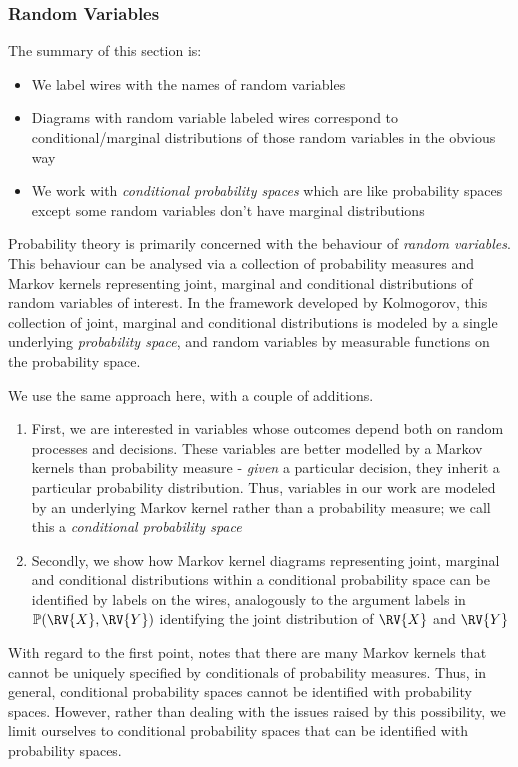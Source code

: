 \subsubsection{Random Variables}\label{par:random_variables}

The summary of this section is:
\begin{itemize}
\item We label wires with the names of random variables
\item Diagrams with random variable labeled wires correspond to conditional/marginal distributions of those random variables in the obvious way
\item We work with \emph{conditional probability spaces} which are like probability spaces except some random variables don't have marginal distributions
\end{itemize}

Probability theory is primarily concerned with the behaviour of \emph{random variables}. This behaviour can be analysed via a collection of probability measures and Markov kernels representing joint, marginal and conditional distributions of random variables of interest. In the framework developed by Kolmogorov, this collection of joint, marginal and conditional distributions is modeled by a single underlying \emph{probability space}, and random variables by measurable functions on the probability space. 

We use the same approach here, with a couple of additions. 

\begin{enumerate}
	\item First, we are interested in variables whose outcomes depend both on random processes and decisions. These variables are better modelled by a Markov kernels than probability measure - \emph{given} a particular decision, they inherit a particular probability distribution. Thus, variables in our work are modeled by an underlying Markov kernel rather than a probability measure; we call this a \emph{conditional probability space}
	\item Secondly, we show how Markov kernel diagrams representing joint, marginal and conditional distributions within a conditional probability space can be identified by labels on the wires, analogously to the argument labels in $\mathbb{P}(\RV{X},\RV{Y})$ identifying the joint distribution of $\RV{X}$ and $\RV{Y}$ 
\end{enumerate}

With regard to the first point, \citet{hajek_what_2003} notes that there are many Markov kernels that cannot be uniquely specified by conditionals of probability measures. Thus, in general, conditional probability spaces cannot be identified with probability spaces. However, rather than dealing with the issues raised by this possibility, we limit ourselves to conditional probability spaces that can be identified with probability spaces.

